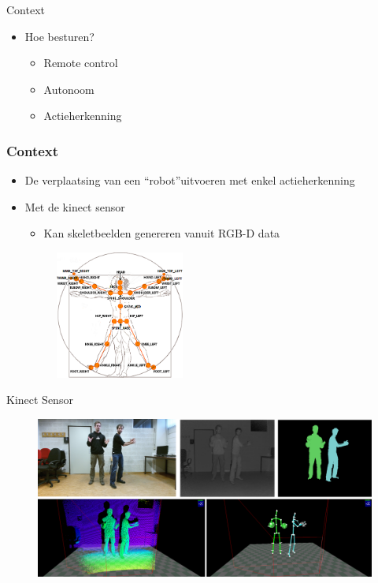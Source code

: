 \documentclass[]{beamer}
\begin{document}
	\begin{frame}{Context}
		\begin{itemize}
			\item Hoe besturen?
				\begin{itemize}
					\item Remote control
					\item Autonoom
					\item Actieherkenning
				\end{itemize}
			\end{itemize}
	\end{frame}

	\begin{frame}\frametitle{Context}
		\begin{itemize}
			\item De verplaatsing van een \textquotedblleft robot\textquotedblright uitvoeren met enkel actieherkenning
			\item<2-> Met de kinect sensor
			\begin{itemize}
				\item Kan skeletbeelden genereren vanuit RGB-D data
			\end{itemize}
			\begin{figure}
				\includegraphics[width=0.4\textwidth]{skeleton}
			\end{figure}	
		\end{itemize}
	\end{frame}
	\begin{frame}{Kinect Sensor}
		\begin{figure}
			\includegraphics[width=\textwidth]{sensoren}
		\end{figure}
	\end{frame}
\end{document}
